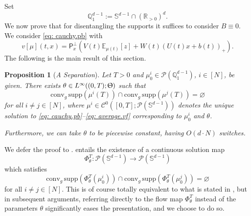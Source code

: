 \documentclass[a4paper,11pt]{article}
\theoremstyle{plain}
\newtheorem{proposition}[theorem]{Proposition}
\newcommand{\supp}{\mathrm{supp}}
\newcommand{\R}{\mathbb{R}}
\newcommand{\proj}{\bm{\mathsf{P}}^\perp}
\newcommand{\conv}{\mathrm{conv}}
\renewcommand{\S}{\mathbb{S}^{d-1}}
\newcommand{\bW}{\bm{\mathit{W}}}
\newcommand{\bV}{\bm{\mathit{V}}}
\newcommand{\bB}{\bm{\mathit{B}}}
\newcommand{\bU}{\bm{\mathit{U}}}
\newcommand{\Q}{\mathbb{Q}}
\numberwithin{equation}{section}
\begin{document}

Set 
$$\mathbb{Q}_1^{d-1}:=\S\cap (\R_{>0})^d.$$
We now prove that for disentangling the supports it suffices to consider $\bB\equiv0$. We consider \eqref{eq: cauchy.pb} with 
 \begin{equation} \label{eq: average.vf}
    v[\mu](t,x) = \proj_x\left(\bV(t)\mathbb{E}_{\mu(t)}[z]+\bW(t)(\bU(t)x+b(t))_+\right).
\end{equation}
The following is the main result of this section.

\begin{proposition}[\emph{A Separation}] \label{prop: separation}
Let $T>0$ and $\mu_0^i\in\mathscr{P}(\Q_1^{d-1})$, $i\in[N]$, be given.
There exists $\theta\in L^\infty((0,T);\Uptheta)$ such that
\begin{equation*}
    \conv_g\, \supp(\mu^i(T))\cap \conv_g \,\supp(\mu^j(T))=\varnothing
\end{equation*}
for all $i\neq j\in[N]$, where $\mu^i \in \mathscr{C}^0([0,T];\mathscr{P}(\S))$ denotes the unique solution to \eqref{eq: cauchy.pb}--\eqref{eq: average.vf} corresponding to $\mu_0^i$ and $\theta$. 

Furthermore, we can take $\theta$ to be piecewise constant, having $O(d\cdot N)$ switches.
\end{proposition}

We defer the proof to {\bf {}}.
 entails the existence of a continuous solution map 
$$\Phi^T_{\theta}:\mathscr{P}(\S)\to\mathscr{P}(\S)$$ 
which satisfies
\begin{equation*}
\conv_g\, \supp\left(\Phi^T_\theta(\mu_0^i)\right)\cap \conv_g\, \supp\left(\Phi^T_\theta(\mu_0^j)\right)=\varnothing
\end{equation*}
for all $i\neq j\in[N]$.
This is of course totally equivalent to what is stated in , but in subsequent arguments, referring directly to the flow map $\Phi^T_\theta$ instead of the parameters $\theta$ significantly eases the presentation, and we choose to do so.

\begin{figure}[omitted: a diagram of this paper's results, not reproduced here]\label{fig: overview.1}\end{figure}
\end{document}
